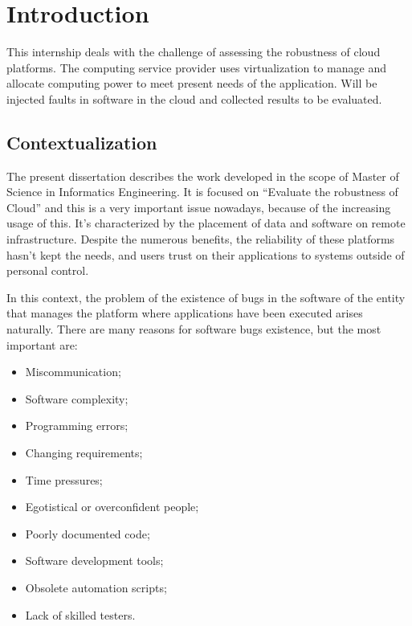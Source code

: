 \newpage
\section{Introduction}

This internship deals with the challenge of assessing the robustness of cloud platforms. The computing service provider uses virtualization to manage and allocate computing power to meet present needs of the application. Will be injected faults in software in the cloud and collected results to be evaluated.

\subsection{Contextualization}


The present dissertation describes the work developed in the scope of Master of Science in Informatics Engineering. It is focused on ``Evaluate the robustness of Cloud'' and this is a very important issue nowadays, because of the increasing usage of this.
It's characterized by the placement of data and software on remote infrastructure. Despite the numerous benefits, the reliability of these platforms hasn't kept the needs, and users trust on their applications to systems outside of personal control.

In this context, the problem of the existence of bugs in the software of the entity that manages the platform where applications have been executed arises naturally. There are many reasons for software bugs existence, but the most important are:

\begin{itemize}
	\item Miscommunication;
	\item Software complexity;
	\item Programming errors;
	\item Changing requirements;
	\item Time pressures;
	\item Egotistical or overconfident people;
	\item Poorly documented code;
	\item Software development tools;
	\item Obsolete automation scripts;
	\item Lack of skilled testers.
\end{itemize}

